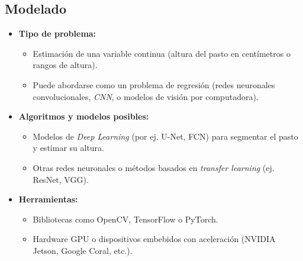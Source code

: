 \documentclass[
11pt, %
]{ProyectoVpC}
\begin{document}
\subsection{Modelado}
\begin{itemize}
  \item \textbf{Tipo de problema:} 
    \begin{itemize}
      \item Estimación de una variable continua (altura del pasto en centímetros o rangos de altura).
      \item Puede abordarse como un problema de regresión (redes neuronales convolucionales, \emph{CNN}, o modelos de visión por computadora).
    \end{itemize}
  \item \textbf{Algoritmos y modelos posibles:}
    \begin{itemize}
      \item Modelos de \emph{Deep Learning} (por ej. U-Net, FCN) para segmentar el pasto y estimar su altura.
      \item Otras redes neuronales o métodos basados en \emph{transfer learning} (ej. ResNet, VGG).
    \end{itemize}
  \item \textbf{Herramientas:}
    \begin{itemize}
      \item Bibliotecas como OpenCV, TensorFlow o PyTorch.
      \item Hardware GPU o dispositivos embebidos con aceleración (NVIDIA Jetson, Google Coral, etc.).
    \end{itemize}
\end{itemize}
\end{document}
